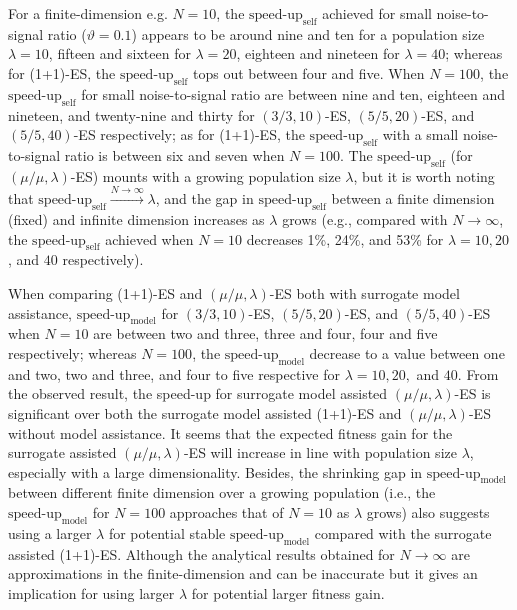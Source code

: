 For a finite-dimension e.g. $N=10$, the $\text{speed-up}_{\text{self}}$ achieved for small noise-to-signal ratio ($\vartheta=0.1$) appears to be around nine and ten for a population size $\lambda=10$, fifteen and sixteen for $\lambda = 20$, eighteen and nineteen for $\lambda=40$; whereas for (1+1)-ES, the $\text{speed-up}_{\text{self}}$ tops out between four and five. When $N=100$, the $\text{speed-up}_{\text{self}}$ for small noise-to-signal ratio are between nine and ten, eighteen and nineteen, and twenty-nine and thirty for $(3/3,10)$-ES, $(5/5,20)$-ES, and $(5/5,40)$-ES respectively; as for (1+1)-ES, the $\text{speed-up}_{\text{self}}$ with a small noise-to-signal ratio is between six and seven when $N=100$. The $\text{speed-up}_{\text{self}}$ (for $(\mu/\mu,\lambda)$-ES) mounts with a growing population size $\lambda$, but it is worth noting that $\text{speed-up}_{\text{self}} \overset{N \rightarrow \infty}{\rightarrow} \lambda$, and the gap in $\text{speed-up}_{\text{self}}$ between a finite dimension (fixed) and infinite dimension increases as $\lambda$ grows (e.g., compared with $N\rightarrow \infty$, the $\text{speed-up}_{\text{self}}$ achieved when $N=10$ decreases 1\%, 24\%, and 53\% for $\lambda=10,20$, and $40$ respectively).  

When comparing (1+1)-ES and $(\mu/\mu,\lambda)$-ES both with surrogate model assistance, $\text{speed-up}_{\text{model}}$ for $(3/3,10)$-ES, $(5/5,20)$-ES, and $(5/5,40)$-ES when $N=10$ are between two and three, three and four, four and five respectively; whereas $N=100$, the $\text{speed-up}_{\text{model}}$ decrease to a value between one and two, two and three, and four to five respective for $\lambda=10,20,$ and $40$. From the observed result, the speed-up for surrogate model assisted $(\mu/\mu,\lambda)$-ES is significant over both the surrogate model assisted (1+1)-ES and $(\mu/\mu,\lambda)$-ES without model assistance. It seems that the expected fitness gain for the surrogate assisted $(\mu/\mu,\lambda)$-ES will increase in line with population size $\lambda$, especially with a large dimensionality. Besides, the shrinking gap in $\text{speed-up}_{\text{model}}$ between different finite dimension over a growing population (i.e., the $\text{speed-up}_{\text{model}}$ for $N=100$ approaches that of $N=10$ as $\lambda$ grows) also suggests using a larger $\lambda$ for potential stable $\text{speed-up}_{\text{model}}$ compared with the surrogate assisted (1+1)-ES. Although the analytical results obtained for $N\rightarrow \infty$ are approximations in the finite-dimension and can be inaccurate but it gives an implication for using larger $\lambda$ for potential larger fitness gain.

